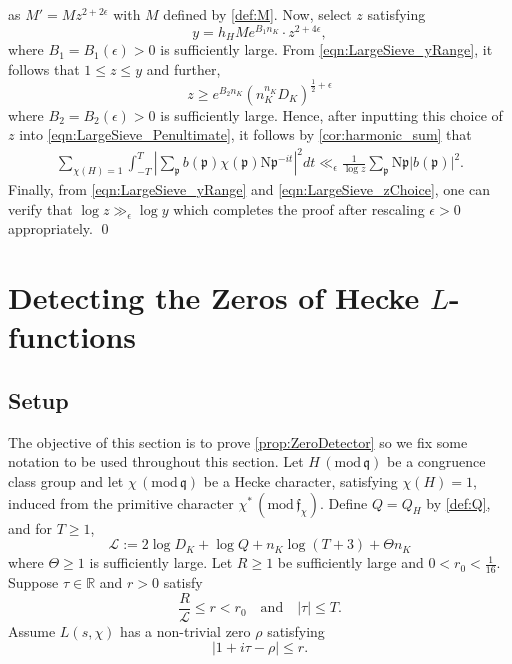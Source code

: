 \documentclass[12pt,psamsfonts]{amsart}
\theoremstyle{definition}
\theoremstyle{remark}
\numberwithin{equation}{section}
\newcounter{notation}
\theoremstyle{plain}
\theoremstyle{remark}
\renewcommand{\1}{ {\bf 1}}
\newcommand{\kf}{\mathfrak{f}}
\newcommand{\cL}{\mathcal{L}}
\renewcommand{\pmod}[1]{\, (\mathrm{mod} {\, #1})}
\newcommand{\N}{\mathrm{N}}
\newcommand{\kp}{\mathfrak{p}}
\newcommand{\kq}{\mathfrak{q}}
\newcommand{\R}{\mathbb{R}}
\begin{document}
as $M' = M z^{2+2\epsilon}$ with $M$ defined by \eqref{def:M}. Now, select $z$ satisfying
\begin{equation}
y = h_H M e^{B_1 n_K} \cdot  z^{2+4\epsilon}, 
\label{eqn:LargeSieve_zChoice}
\end{equation}
where $B_1 = B_1(\epsilon) > 0$ is sufficiently large. From \eqref{eqn:LargeSieve_yRange}, it follows that $1 \leq z \leq y$ and further,
\[
z \geq e^{B_2 n_K} (n_K^{n_K} D_K)^{\tfrac{1}{2}+\epsilon}
\]
where $B_2 = B_2(\epsilon) > 0$ is sufficiently large. Hence, after inputting this choice of $z$ into \eqref{eqn:LargeSieve_Penultimate}, it follows by \cref{cor:harmonic_sum} that
\begin{align*}
\sum_{\chi(H)=1}\int_{-T}^{T}\left|\sum_{\kp}b(\kp)\chi(\kp)\N\kp^{-it}\right|^2 dt
\ll_{\epsilon}  \frac{1}{\log z} \sum_{\kp} \N\kp |b(\kp)|^2.
\end{align*}
Finally, from \eqref{eqn:LargeSieve_yRange} and \eqref{eqn:LargeSieve_zChoice}, one can verify that $\log z \gg_{\epsilon} \log y$ which completes the proof after rescaling $\epsilon > 0$ appropriately. 
\hfill \qed

 
  
\section{Detecting the Zeros of Hecke $L$-functions}
\label{sec:ZeroDetector}
\subsection{Setup}

The objective of this section is to prove \cref{prop:ZeroDetector} so we fix some notation to be used throughout this section. Let $H \pmod{\kq}$ be a congruence class group and let $\chi \pmod{\kq}$ be a Hecke character, satisfying $\chi(H) = 1$,  induced from the primitive character $\chi^* \pmod{\kf_{\chi}}$. Define $Q=Q_H$ by \eqref{def:Q}, and for $T \geq 1$, 
\begin{equation}
\cL := 2 \log D_K + \log Q + n_K \log(T+3) + \Theta n_K
\label{def:cL}
\end{equation}
where $\Theta \geq 1$ is sufficiently large. Let $R \geq 1$ be sufficiently large and $0 < r_0 < \tfrac{1}{16}$.  Suppose $\tau \in \R$ and $r > 0$ satisfy
\begin{equation}
\frac{R}{\cL} \leq r < r_0 \quad \text{and} \quad  |\tau| \leq T. 
\end{equation}
Assume $L(s,\chi)$ has a non-trivial zero $\rho$ satisfying
\begin{equation}
|1+i\tau-\rho| \leq r
\label{DetectedZero}. 
\end{equation}
\end{document}
